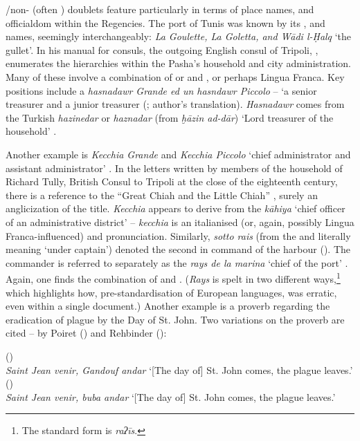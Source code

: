 \documentclass[output=paper]{langsci/langscibook}
\begin{document}
	/non- (often ) doublets feature particularly in terms of place names, and officialdom within the Regencies. The port of Tunis was known by its ,  and  names, seemingly interchangeably: \textit{La Goulette, La Goletta, and Wādi l-Ḥalq} ‘the gullet’. In his manual for  consuls, the outgoing English consul of Tripoli, , enumerates the hierarchies within the Pasha’s household and city administration. Many of these involve a combination of  or  and , or perhaps Lingua Franca. Key positions include a \textit{hasnadawr Grande ed un hasndawr Piccolo} – ‘a senior treasurer and a junior treasurer (\citealt[97]{Pennell1982}; author's translation).  \textit{Hasnadawr} comes from the  {Turkish} \textit{hazinedar} or \textit{haznadar} (from  \textit{ḫāzin ad-dār}) ‘Lord treasurer of the household’ \citep{Gilson1987}.
	
	Another example is \textit{Kecchia Grande} and \textit{Kecchia Piccolo} ‘chief administrator and assistant administrator’ \citep[104]{Pennell1982}. In the letters written by members of the household of Richard Tully, British Consul to Tripoli at the close of the eighteenth century, there is a reference to the ``Great Chiah and the Little Chiah'' \citep[70]{Tully1819}, surely an anglicization of the title. \textit{Kecchia} appears to derive from the   \textit{kāhiya} ‘chief officer of an administrative district’ – \textit{kecchia} is an italianised (or, again, possibly Lingua Franca-influenced)  and pronunciation. Similarly, \textit{sotto rais} (from the  and  literally meaning ‘under captain’) denoted the second in command of the harbour (\citealt[97, 100]{Pennell1982}). The commander is referred to separately as the \textit{rays de la marina} ‘chief of the port’ \citep[92]{Pennell1982}. Again, one finds the combination of  and . (\textit{Rays} is spelt in two different ways,\footnote{The standard  form is \textit{raʔīs}.} which highlights how, pre-standardisation of European languages,  was erratic, even within a single document.) Another example is a proverb regarding the eradication of plague by the Day of St. John. Two variations on the proverb are cited – by Poiret (\citeyear{Poiret1802}) and Rehbinder (\citeyear{Rehbinder1800}): 
	
	\ea
	(\citealt{Poiret1802})\\
	\textit{Saint Jean venir, Gandouf andar} 
	\glt ‘[The day of] St. John comes, the plague leaves.’
	\ex 
	(\citealt{Rehbinder1800})\\
	\textit{Saint Jean venir, buba andar} 
	\glt ‘[The day of] St. John comes, the plague leaves.’ 
	\z
	
\end{document}
